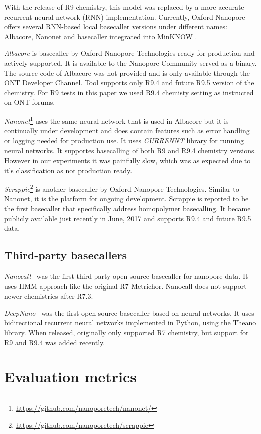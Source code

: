 \documentclass[runningheads,a4paper]{llncs}
\begin{document}
With the release of R9 chemistry, this model was replaced by a more accurate recurrent neural network (RNN) implementation. Currently, Oxford Nanopore offers several RNN-based local basecaller versions under different names: Albacore, Nanonet and basecaller integrated into MinKNOW \cite{ont-basecallers}.

\emph{Albacore} is basecaller by Oxford Nanopore Technologies ready for production and actively supported.
It is available to the Nanopore Community served as a binary. The source code of Albacore was not provided and is only available through the ONT Developer Channel. Tool supports only R9.4 and future R9.5 version of the chemistry. For R9 tests in this paper we used R9.4 chemisty setting as instructed on ONT forums.

\emph{Nanonet}\footnote{\url{https://github.com/nanoporetech/nanonet/}} uses the same neural network that is used in Albacore but it is continually under development and does contain features such as error handling or logging needed for production use. It uses \emph{CURRENNT} library for running neural networks. It supportes basecalling of both R9 and R9.4 chemistry versions. However in our experiments it was painfully slow, which was as expected due to it's classification as not production ready.

\emph{Scrappie}\footnote{\url{https://github.com/nanoporetech/scrappie}} is another basecaller by Oxford Nanopore Technologies. Similar to Nanonet, it is the platform for ongoing development. Scrappie is reported to be the first basecaller  that specifically address homopolymer basecalling. It became publicly available just recently in June, 2017 and supports R9.4 and future R9.5 data.

\subsection{Third-party basecallers}
\emph{Nanocall}~\cite{David046086} was the first third-party open source basecaller for nanopore data. It uses HMM approach like the original R7 Metrichor. Nanocall does not support newer chemistries after R7.3.

\emph{DeepNano}~\cite{Boza2017}  was the first open-source basecaller based on neural networks. It uses bidirectional recurrent neural networks implemented in Python, using the Theano library. When released, originally only supported R7 chemistry, but support for R9 and R9.4 was added recently.

\section{Evaluation metrics}
\end{document}
